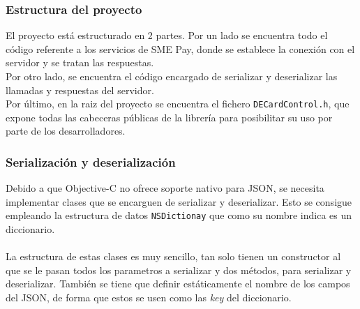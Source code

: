 \documentclass[a4paper, 12pt]{article}
\begin{document}
\subsubsection{Estructura del proyecto}
\label{sec-4-2-1}
El proyecto está estructurado en 2 partes. Por un lado se encuentra todo el código referente a los servicios de SME Pay, donde se establece la conexión con el servidor y se tratan las respuestas.
\\
Por otro lado, se encuentra el código encargado de serializar y deserializar las llamadas y respuestas del servidor.
\\
Por último, en la raiz del proyecto se encuentra el fichero \verb~DECardControl.h~, que expone todas las cabeceras públicas de la librería para posibilitar su uso por parte de los desarrolladores.
\subsubsection{Serialización y deserialización}
\label{sec-4-2-2}
Debido a que Objective-C no ofrece soporte nativo para JSON, se necesita implementar clases que se encarguen de serializar y deserializar. Esto se consigue empleando la estructura de datos \verb~NSDictionay~
que como su nombre indica es un diccionario.
\\
\\
La estructura de estas clases es muy sencillo, tan solo tienen un constructor al que se le pasan todos los parametros a serializar y dos métodos, para serializar y deserializar. También se tiene que definir
estáticamente el nombre de los campos del JSON, de forma que estos se usen como las \emph{key} del diccionario.
\end{document}
